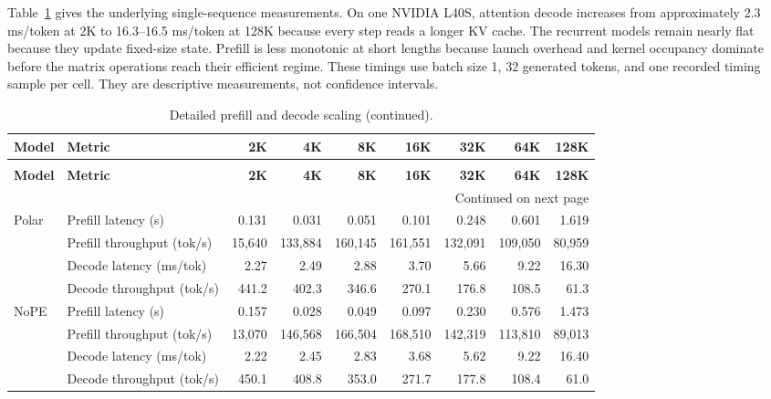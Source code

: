 \begin{landscape}
Table~\ref{table:serving_detailed_matrix} gives the underlying single-sequence measurements. On one NVIDIA L40S, attention decode increases from approximately 2.3 ms/token at 2K to 16.3--16.5 ms/token at 128K because every step reads a longer KV cache. The recurrent models remain nearly flat because they update fixed-size state. Prefill is less monotonic at short lengths because launch overhead and kernel occupancy dominate before the matrix operations reach their efficient regime. These timings use batch size 1, 32 generated tokens, and one recorded timing sample per cell. They are descriptive measurements, not confidence intervals.
\begingroup
\small
\setlength{\tabcolsep}{4pt}
\begin{longtable}{llrrrrrrr}
\caption{Detailed prefill and decode scaling from 2K to 128K tokens on one NVIDIA L40S GPU (batch size 1, 32 generated tokens).}\label{table:serving_detailed_matrix}\\
\toprule
\textbf{Model} & \textbf{Metric} & \textbf{2K} & \textbf{4K} & \textbf{8K} & \textbf{16K} & \textbf{32K} & \textbf{64K} & \textbf{128K} \\
\midrule
\endfirsthead
\caption[]{Detailed prefill and decode scaling (continued).}\\
\toprule
\textbf{Model} & \textbf{Metric} & \textbf{2K} & \textbf{4K} & \textbf{8K} & \textbf{16K} & \textbf{32K} & \textbf{64K} & \textbf{128K} \\
\midrule
\endhead
\midrule
\multicolumn{9}{r}{Continued on next page}\\
\endfoot
\bottomrule
\endlastfoot
Polar & Prefill latency (s) & 0.131 & 0.031 & 0.051 & 0.101 & 0.248 & 0.601 & 1.619 \\
& Prefill throughput (tok/s) & 15,640 & 133,884 & 160,145 & 161,551 & 132,091 & 109,050 & 80,959 \\
& Decode latency (ms/tok) & 2.27 & 2.49 & 2.88 & 3.70 & 5.66 & 9.22 & 16.30 \\
& Decode throughput (tok/s) & 441.2 & 402.3 & 346.6 & 270.1 & 176.8 & 108.5 & 61.3 \\
\midrule
NoPE & Prefill latency (s) & 0.157 & 0.028 & 0.049 & 0.097 & 0.230 & 0.576 & 1.473 \\
& Prefill throughput (tok/s) & 13,070 & 146,568 & 166,504 & 168,510 & 142,319 & 113,810 & 89,013 \\
& Decode latency (ms/tok) & 2.22 & 2.45 & 2.83 & 3.68 & 5.62 & 9.22 & 16.40 \\
& Decode throughput (tok/s) & 450.1 & 408.8 & 353.0 & 271.7 & 177.8 & 108.4 & 61.0 \\

\end{longtable}
\end{landscape}
